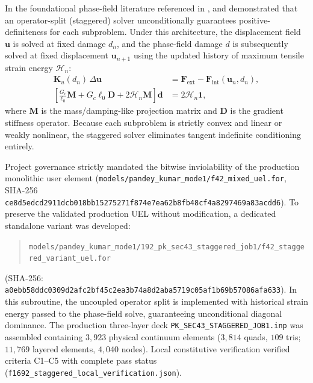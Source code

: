 In the foundational phase-field literature referenced in \citet[Ref.~72]{pandey2025}, \citet{miehe2010a} and \citet{molnar2017} demonstrated that an operator-split (staggered) solver unconditionally guarantees positive-definiteness for each subproblem. Under this architecture, the displacement field $\mathbf{u}$ is solved at fixed damage $d_n$, and the phase-field damage $d$ is subsequently solved at fixed displacement $\mathbf{u}_{n+1}$ using the updated history of maximum tensile strain energy $\mathcal{H}_n$:
\begin{align}
  \mathbf{K}_u(d_n) \, \Delta \mathbf{u} &= \mathbf{F}_{\mathrm{ext}} - \mathbf{F}_{\mathrm{int}}(\mathbf{u}_n, d_n), \\
  \left[ \frac{G_c}{\ell_0} \mathbf{M} + G_c \ell_0 \mathbf{D} + 2 \mathcal{H}_n \mathbf{M} \right] \mathbf{d} &= 2 \mathcal{H}_n \mathbf{1},
\end{align}
where $\mathbf{M}$ is the mass/damping-like projection matrix and $\mathbf{D}$ is the gradient stiffness operator. Because each subproblem is strictly convex and linear or weakly nonlinear, the staggered solver eliminates tangent indefinite conditioning entirely.

Project governance strictly mandated the bitwise inviolability of the production monolithic user element (\texttt{models/pandey\_kumar\_mode1/f42\_mixed\_uel.for}, SHA-256 \texttt{ce8d5edcd2911dcb018bb15275271f874e7ea62b8fb48cf4a8297469a83acdd6}). To preserve the validated production UEL without modification, a dedicated standalone variant was developed:
\begin{quote}
\texttt{models/pandey\_kumar\_mode1/192\_pk\_sec43\_staggered\_job1/f42\_staggered\_variant\_uel.for}
\end{quote}
(SHA-256: \texttt{a0ebb58ddc0309d2afc2bf45c2ea3b74a8d2aba5719c05af1b69b57086afa633}). In this subroutine, the uncoupled operator split is implemented with historical strain energy passed to the phase-field solve, guaranteeing unconditional diagonal dominance. The production three-layer deck \texttt{PK\_SEC43\_STAGGERED\_JOB1.inp} was assembled containing $3{,}923$ physical continuum elements ($3{,}814$ quads, $109$ tris; $11{,}769$ layered elements, $4{,}040$ nodes). Local constitutive verification verified criteria C1--C5 with complete pass status (\texttt{f1692\_staggered\_local\_verification.json}).

